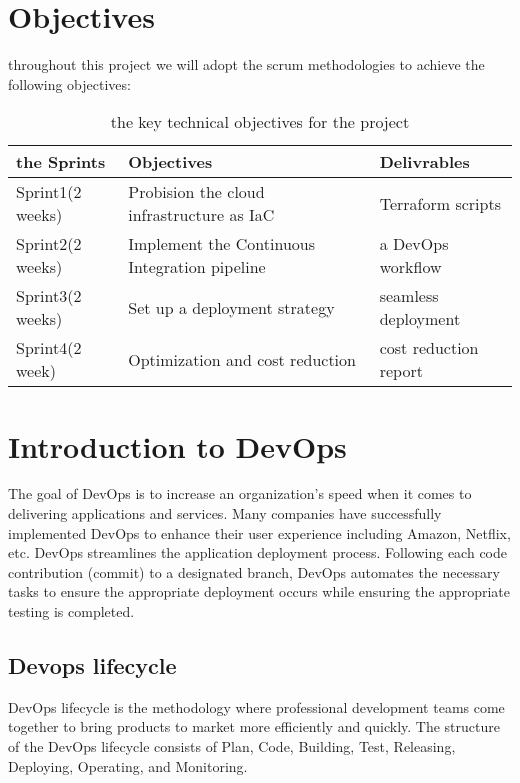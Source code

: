 \section{Objectives}
throughout  this project we will adopt the scrum methodologies to achieve the following objectives:
\begin{longtable}[c]{
    |p{}
    |p{}|
    p{}|
    }
    \caption{the key technical objectives for the project}
    \label{tab:objectivesTable}                      \\
    \hline

    the Sprints
     & Objectives
     & Delivrables                                   \\
    \hline

    Sprint1(2 weeks)
     & Probision the cloud infrastructure as IaC
     & Terraform scripts                             \\
    \hline

    Sprint2(2 weeks)
     & Implement the Continuous Integration pipeline
     & a DevOps workflow                             \\
    \hline

    Sprint3(2 weeks)
     & Set up a deployment strategy
     & seamless deployment                           \\
    \hline

    Sprint4(2 week)
     & Optimization and cost reduction
     & cost reduction report                         \\
    \hline
\end{longtable}

\section{Introduction to DevOps}
The goal of DevOps is to increase an organization's speed when it comes to delivering applications and services. Many companies have successfully implemented DevOps to enhance their user experience including Amazon, Netflix, etc.
DevOps streamlines the application deployment process. Following each code contribution (commit) to a designated branch, DevOps automates the necessary tasks to ensure the appropriate deployment occurs while ensuring the appropriate testing is completed.
\subsection*{Devops lifecycle}
DevOps lifecycle is the methodology where professional development teams come together to bring products to market more efficiently and quickly. The structure of the DevOps lifecycle consists of Plan, Code, Building, Test, Releasing, Deploying, Operating,  and Monitoring.

